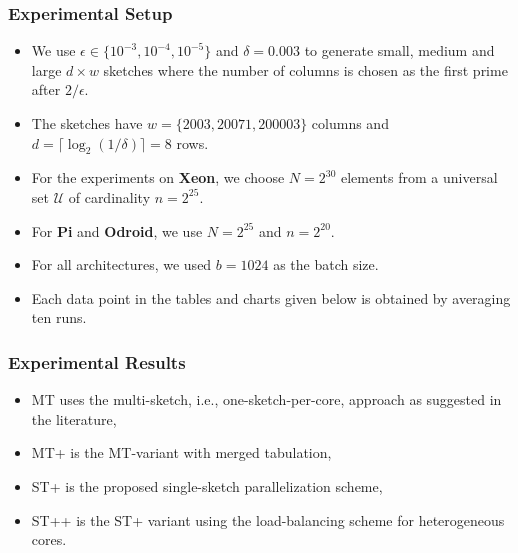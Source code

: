 \documentclass{beamer}
\begin{document}
\begin{frame}
	\frametitle{Experimental Setup}
	\begin{itemize}
	\item We use $\epsilon \in \{10^{-3}, 10^{-4}, 10^{-5}\}$ and $\delta = 0.003$ to generate small, medium and large $d \times w$ sketches  where the number of columns is chosen as the first prime after $2/\epsilon$. 
	\item The sketches have $w = \{2003, 20071, 200003\}$ columns and $d = \lceil \log_2(1/\delta) \rceil = 8$ rows. 
	\item For the experiments on {\bf Xeon}, we choose $N = 2^{30}$ elements from a universal set $\mathcal{U}$ of cardinality $n = 2^{25}$. 
	\item For {\bf Pi} and   {\bf Odroid}, we use $N = 2^{25}$ and $n = 2^{20}$. 
	\item For all architectures, we used $b = 1024$ as the batch size. 
	\item Each data point in the tables and charts given below is obtained by averaging ten runs.
	\end{itemize}
\end{frame}


\begin{frame}
	\frametitle{Experimental Results}
\begin{itemize} 
\item MT uses the multi-sketch, i.e., one-sketch-per-core, approach as suggested in the literature, 
\item MT+ is the MT-variant with merged tabulation, 
\item ST+ is the proposed single-sketch parallelization scheme,
\item ST++ is the ST+ variant using the load-balancing scheme for heterogeneous cores.
\end{itemize} 
\end{frame}
\end{document}
